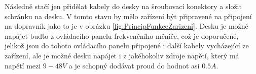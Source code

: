 Následně stačí jen přidělat kabely do desky na šroubovací konektory a složit schránku na desku. V tomto stavu by mělo zařízení být připravené na připojení na dopravník jako to je v obrázku \ref{fig:PrincipFunkceZarizeni}. Desku je možné napájet buďto z ovládacího panelu frekvenčního měniče, což je doporučené, jelikož jsou do tohoto ovládacího panelu připojené i další kabely vycházející ze zařízení, ale je možné desku napájet i z jakéhokoliv zdroje napětí, který má napětí mezi $9-48V$ a je schopný dodávat proud do hodnot asi $0.5A$.



